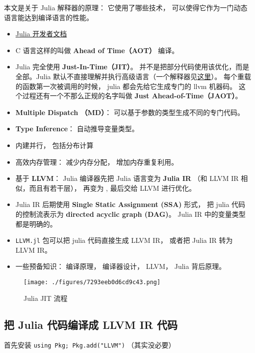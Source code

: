 
\begin{issues}
\issueDraft
\end{issues}

本文是关于 Julia 解释器的原理： 它使用了哪些技术， 可以使得它作为一门动态语言能达到编译语言的性能。

\begin{itemize}
\item \href{https://docs.julialang.org/en/v1/devdocs/init/}{Julia 开发者文档}
\item C 语言这样的叫做 \textbf{Ahead of Time（AOT）} 编译。
\item Julia 完全使用 \textbf{Just-In-Time（JIT）}。 并不是把部分代码使用该优化，而是全部。Julia 默认不直接理解并执行高级语言（一个解释器见\href{https://juliadebug.github.io/JuliaInterpreter.jl/stable/}{这里}）。 每个重载的函数第一次被调用的时候， julia 都会先给它生成专门的 llvm 机器码。 这个过程还有一个不那么正规的名字叫做 \textbf{Just Ahead-of-Time（JAOT）}。
\item \textbf{Multiple Dispatch （MD）}： 可以基于参数的类型生成不同的专门代码。
\item \textbf{Type Inference}： 自动推导变量类型。
\item 内建并行， 包括分布计算
\item 高效内存管理： 减少内存分配， 增加内存重复利用。
\item 基于 \textbf{LLVM}： Julia 编译器先把 Julia 语言变为 \textbf{Julia IR} （和 LLVM IR 相似，而且有若干层）， 再变为 , 最后交给 LLVM 进行优化。
\item Julia IR 后期使用 \textbf{Single Static Assignment (SSA)} 形式， 把 julia 代码的控制流表示为 \textbf{directed acyclic graph (DAG)}。 Julia IR 中的变量类型都是明确的。
\item \verb`LLVM.jl` 包可以把 julia 代码直接生成 LLVM IR， 或者把 Julia IR 转为 LLVM IR。
\item 一些预备知识： 编译原理， 编译器设计， LLVM， Julia 背后原理。
\end{itemize}

\begin{figure}[ht]
\centering
\texttt{[image: ./figures/7293eeb0d6cd9c43.png]}
\caption{Julia JIT 流程} \label{fig_julia0_1}
\end{figure}

\subsection{把 Julia 代码编译成 LLVM IR 代码}
首先安装 \verb`using Pkg; Pkg.add("LLVM")` （其实没必要）

